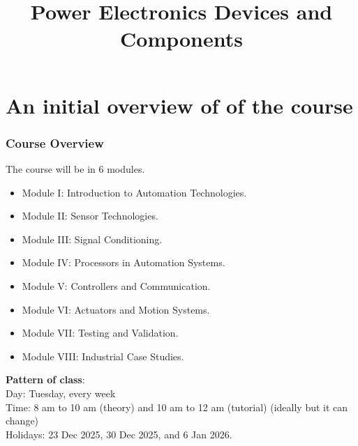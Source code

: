 \section{An initial overview of of the course}
\title[Initial overview]{Power Electronics Devices and Components}
 
\begin{frame}[plain]
    \titlepage
\end{frame}
\begin{frame}
	\frametitle{Course Overview}
The course will be in 6 modules.
		\begin{itemize}
		  \item Module I: Introduction to Automation Technologies.
		  \item Module II: Sensor Technologies.
		  \item Module III: Signal Conditioning.
		  \item Module IV: Processors in Automation Systems.
		  \item Module V: Controllers and Communication.
		  \item Module VI: Actuators and Motion Systems.
		  \item Module VII: Testing and Validation.
		  \item Module VIII: Industrial Case Studies.
		\end{itemize}
\textbf{Pattern of class}: \\ Day: Tuesday, every week \\ 
Time: 8 am to 10 am (theory) and 10 am to 12 am (tutorial) (ideally but it can change) \\
Holidays: 23 Dec 2025, 30 Dec 2025, and 6 Jan 2026. %
\end{frame}

